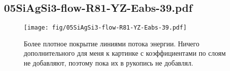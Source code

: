 \documentclass[fullscreen=true]{beamer}
\begin{document}
\subsection{05SiAgSi3-flow-R81-YZ-Eabs-39.pdf}
\begin{frame}
  \begin{figure}
    \texttt{[image: fig/05SiAgSi3-flow-R81-YZ-Eabs-39.pdf]}%
    \caption{Более плотное покрытие линиями потока энергии. Ничего дополнительного для
      меня к картинке с коэффициентами по слоям не добавляют, поэтому
      пока их в рукопись не добавлял.
}
  \end{figure}
\end{frame}
\end{document}
